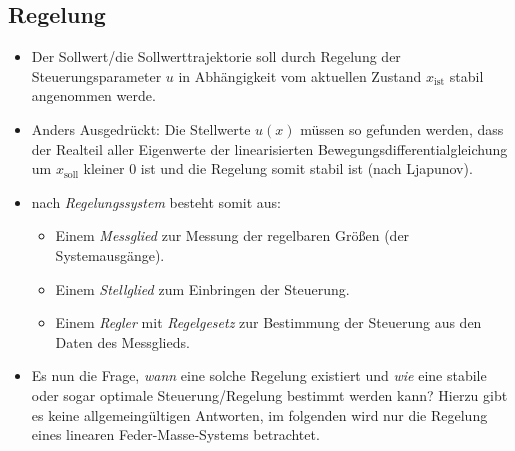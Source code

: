 		\subsection{Regelung} %
			\begin{itemize}
				\item Der Sollwert/die Sollwerttrajektorie soll durch Regelung der Steuerungsparameter \(u\) in Abhängigkeit vom aktuellen Zustand \(x_\text{ist}\) stabil angenommen werde.
				\item Anders Ausgedrückt: Die Stellwerte \(u(x)\) müssen so gefunden werden, dass der Realteil aller Eigenwerte der linearisierten Bewegungsdifferentialgleichung um \(x_\text{soll}\) kleiner \(0\) ist und die Regelung somit stabil ist (nach Ljapunov).
				\item nach \textit{Regelungssystem} besteht somit aus:
					\begin{itemize}
						\item Einem \textit{Messglied} zur Messung der regelbaren Größen (der Systemausgänge).
						\item Einem \textit{Stellglied} zum Einbringen der Steuerung.
						\item Einem \textit{Regler} mit \textit{Regelgesetz} zur Bestimmung der Steuerung aus den Daten des Messglieds.
					\end{itemize}
				\item Es nun die Frage, \textit{wann} eine solche Regelung existiert und \textit{wie} eine stabile oder sogar optimale Steuerung/Regelung bestimmt werden kann? Hierzu gibt es keine allgemeingültigen Antworten, im folgenden wird nur die Regelung eines linearen Feder-Masse-Systems betrachtet.
			\end{itemize}

